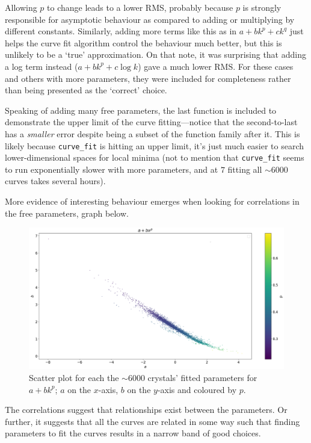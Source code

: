 \documentclass[11pt]{article}
\theoremstyle{definition}
\begin{document}
Allowing $p$ to change leads to a lower RMS, probably because $p$ is strongly responsible for asymptotic behaviour as compared to adding or multiplying by different constants. Similarly, adding more terms like this as in $a+bk^p+ck^q$ just helps the curve fit algorithm control the behaviour much better, but this is unlikely to be a `true' approximation. On that note, it was surprising that adding a log term instead ($a+bk^p+c\log k$) gave a much lower RMS. For these cases and others with more parameters, they were included for completeness rather than being presented as the `correct' choice. 

Speaking of adding many free parameters, the last function is included to demonstrate the upper limit of the curve fitting---notice that the second-to-last has a \emph{smaller} error despite being a subset of the function family after it. This is likely because \texttt{curve\_fit} is hitting an upper limit, it's just much easier to search lower-dimensional spaces for local minima (not to mention that \texttt{curve\_fit} seems to run exponentially slower with more parameters, and at $7$ fitting all $\sim 6000$ curves takes several hours). 

\null

More evidence of interesting behaviour emerges when looking for correlations in the free parameters, graph below.

\begin{figure}[h]
\centering
\includegraphics[scale=0.33]{p_scatter_lrg.png}
\caption{Scatter plot for each the $\sim 6000$ crystals' fitted parameters for $a+bk^p$; $a$ on the $x$-axis, $b$ on the $y$-axis and coloured by $p$.}
\end{figure}

The correlations suggest that relationships exist between the parameters. Or further, it suggests that all the curves are related in some way such that finding parameters to fit the curves results in a narrow band of good choices. 
\end{document}
